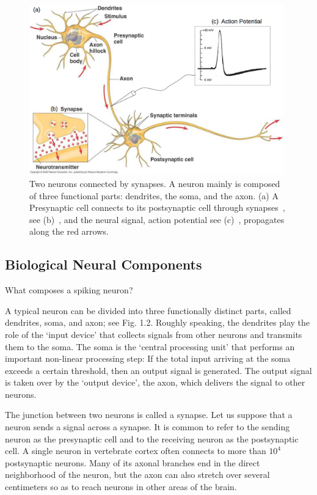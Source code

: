 	\begin{figure}[bt]
		\centering
		\includegraphics[width=0.98\textwidth]{pics_snn/neuron2.png}
		\caption{Two neurons connected by synapses. 
			A neuron mainly is composed of three functional parts: dendrites, the soma, and the axon. (a) A Presynaptic cell connects to its postsynaptic cell through synapses~\cite{reece2011campbell}, see (b)~\cite{reece2011campbell}, and the neural signal, action potential see (c)~\cite{hodgkin1939action}, propagates along the red arrows. }
		\label{Fig:neuron_basic}
	\end{figure}

\subsection{Biological Neural Components}
What composes a spiking neuron?

A typical neuron can be divided into three functionally distinct parts, called dendrites, soma, and axon; see Fig. 1.2. Roughly speaking, the dendrites play the role of the ‘input device’ that collects signals from other neurons and transmits them to the soma. The soma is the ‘central processing unit’ that performs an important non-linear processing step: If the total input arriving at the soma exceeds a certain threshold, then an output signal is generated. The output signal is taken over by the ‘output device’, the axon, which delivers the signal to other neurons.

The junction between two neurons is called a synapse. Let us suppose that a neuron sends a signal across a synapse. It is common to refer to the sending neuron as the presynaptic cell and to the receiving neuron as the postsynaptic cell. A single neuron in vertebrate cortex often connects to more than $10^{4}$ postsynaptic neurons. Many of its axonal branches end in the direct neighborhood of the neuron, but the axon can also stretch over several centimeters so as to reach neurons in other areas of the brain.

